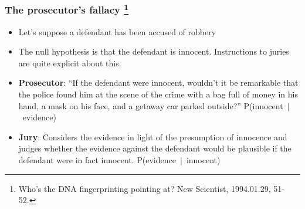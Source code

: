 \documentclass[10pt]{beamer}\usepackage[]{graphicx}\usepackage[]{color}
\newcommand{\blue}[1]{\textcolor{blue}{#1}}
\begin{document}
\begin{frame}
	\frametitle{The prosecutor's fallacy \footnote{{\tiny Who's the DNA fingerprinting pointing at? New Scientist, 1994.01.29, 51-52.}}}
	
	\begin{itemize}
		\setlength\itemsep{1em}
		\item Let's suppose a defendant has been accused of robbery
		\item The null hypothesis is that the defendant is innocent. Instructions to juries are quite explicit about this. 
		\item \textbf{Prosecutor}: ``If the defendant were innocent, wouldn't it be remarkable
		that the police found him at the scene of the crime with a bag full of money in
		his hand, a mask on his face, and a getaway car parked outside?'' \mbox{P(innocent $|$ evidence)}
		\item \textbf{Jury}: Considers the evidence in light of the presumption of innocence
		and judges whether the evidence against the defendant would be plausible if
		the defendant were in fact innocent. \mbox{P(evidence $|$ innocent)}
	\end{itemize}
	
\end{frame}

\end{document}
